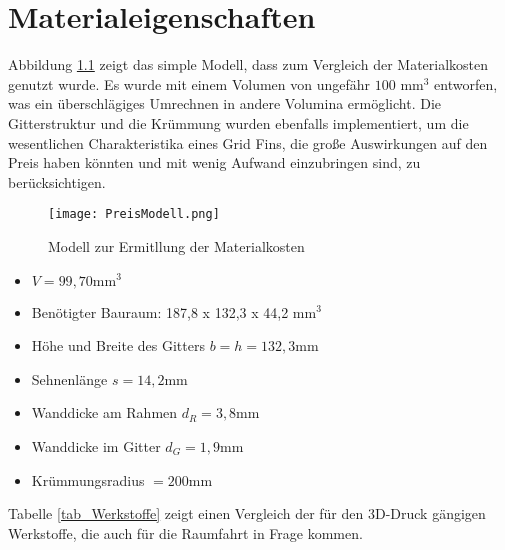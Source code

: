 \chapter{Materialeigenschaften}
Abbildung \ref{abb_100mmModel} zeigt das simple Modell, dass zum Vergleich der Materialkosten genutzt wurde. Es wurde mit einem Volumen von ungefähr $100$ mm$^3$ entworfen, was ein überschlägiges Umrechnen in andere Volumina ermöglicht. Die Gitterstruktur und die Krümmung wurden ebenfalls implementiert, um die wesentlichen Charakteristika eines Grid Fins, die große Auswirkungen auf den Preis haben könnten und mit wenig Aufwand einzubringen sind, zu berücksichtigen.
\begin{figure}[h]
	\centering
	\texttt{[image: PreisModell.png]}
	\caption{Modell zur Ermitllung der Materialkosten}
	\label{abb_100mmModel}
\end{figure}
\begin{itemize}
		\item $V = 99,70\mathrm{mm}^3$
		\item Benötigter Bauraum: 187,8 x 132,3 x 44,2 mm$^3$
		\item Höhe und Breite des Gitters $b = h = 132,3$mm
		\item Sehnenlänge $s = 14,2$mm
		\item Wanddicke am Rahmen $d_R = 3,8$mm
		\item Wanddicke im Gitter $d_G = 1,9$mm
		\item Krümmungsradius $=200$mm
\end{itemize}
Tabelle \ref{tab_Werkstoffe} zeigt einen Vergleich der für den 3D-Druck gängigen Werkstoffe, die auch für die Raumfahrt in Frage kommen.

